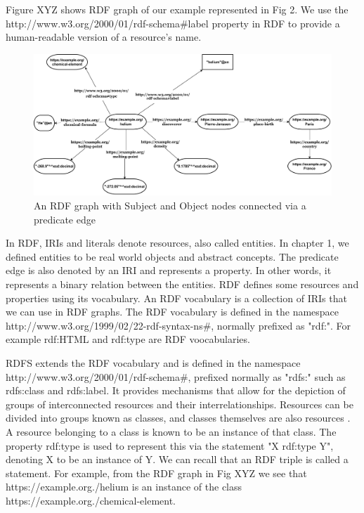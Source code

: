 Figure XYZ shows RDF graph of our example represented in Fig 2. We use the http://www.w3.org/2000/01/rdf-schema\#label property in RDF to provide a human-readable version of a resource's name.

\begin{figure}[h]
  \centering
  \includegraphics[width=0.75 \linewidth]{images/rdf_graph_updated.drawio.pdf}
  \caption{An RDF graph with Subject and Object nodes connected via a predicate edge}
  \label{fig:figure 2}
\end{figure}


In RDF, IRIs and literals denote resources, also called entities. In chapter 1, we defined entities to be real world objects and abstract concepts. The predicate edge is also denoted by an IRI and represents a property. In other words, it represents a binary relation between the entities. RDF defines some resources and properties using its vocabulary. An RDF vocabulary is a collection of IRIs that we can use in RDF graphs. The RDF vocabulary is defined in the namespace http://www.w3.org/1999/02/22-rdf-syntax-ns\#, normally prefixed as "rdf:". For example rdf:HTML and rdf:type are RDF voocabularies.

RDFS extends the RDF vocabulary and is defined in the namespace http://www.w3.org/2000/01/rdf-schema\#, prefixed normally as "rdfs:" such as rdfs:class and rdfs:label. It provides mechanisms that allow for the depiction of groups of interconnected resources and their interrelationships. Resources can be divided into groups known as classes, and classes themselves are also resources \cite{Brickley2014}. A resource belonging to a class is known to be an instance of that class. The property rdf:type is used to represent this via the statement "X rdf:type Y", denoting X to be an instance of Y. We can recall that an RDF triple is called a statement. For example, from the RDF graph in Fig XYZ we see that https://example.org./helium is an instance of the class https://example.org./chemical-element. 


